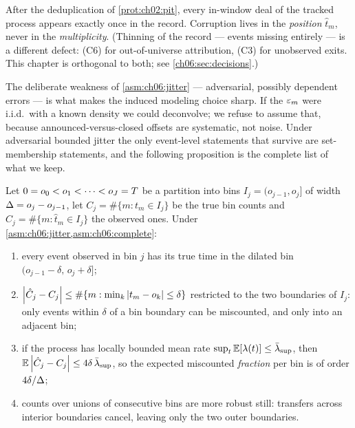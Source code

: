 \begin{assumption}\label{asm:ch06:complete}
After the deduplication of \cref{prot:ch02:pit}, every in-window deal of the
tracked process appears exactly once in the record. Corruption lives in the
\emph{position} $\hat t_m$, never in the \emph{multiplicity}. (Thinning of
the record --- events missing entirely --- is a different defect: (C6) for
out-of-universe attribution, (C3) for unobserved exits. This chapter is
orthogonal to both; see \cref{ch06:sec:decisions}.)
\end{assumption}

The deliberate weakness of \cref{asm:ch06:jitter} --- adversarial, possibly
dependent errors --- is what makes the induced modeling choice sharp. If the
$\varepsilon_m$ were i.i.d.\ with a known density we could deconvolve; we refuse to
assume that, because announced-versus-closed offsets are systematic, not
noise. Under adversarial bounded jitter the only event-level statements that
survive are set-membership statements, and the following proposition is the
complete list of what we keep.

\begin{proposition}\label{prop:ch06:jitterrobust}
Let $0 = o_0 < o_1 < \cdots < o_J = T$ be a partition into bins
$I_j = (o_{j-1}, o_j]$ of width $\Delta = o_j - o_{j-1}$, let
$C_j = \#\{m : t_m \in I_j\}$ be the true bin counts and
$\hat C_j = \#\{m : \hat t_m \in I_j\}$ the observed ones. Under
\cref{asm:ch06:jitter,asm:ch06:complete}:
\begin{enumerate}[label=(\roman*)]
\item every event observed in bin $j$ has its true time in the dilated bin
$(o_{j-1}-\delta,\, o_j+\delta]$;
\item $\left|\hat C_j - C_j\right| \le
\#\{m : \min_k \left|t_m - o_k\right| \le \delta\}$ restricted to the two
boundaries of $I_j$: only events within $\delta$ of a bin boundary can be
miscounted, and only into an adjacent bin;
\item if the process has locally bounded mean rate
$\sup_t \mathbb{E}[\lambda(t)] \le \bar{\lambda}_{\sup}$, then
$\mathbb{E}\left|\hat C_j - C_j\right| \le 4\delta\,\bar{\lambda}_{\sup}$, so the expected
miscounted \emph{fraction} per bin is of order $4\delta/\Delta$;
\item counts over unions of consecutive bins are more robust still:
transfers across interior boundaries cancel, leaving only the two outer
boundaries.
\end{enumerate}
\end{proposition}

